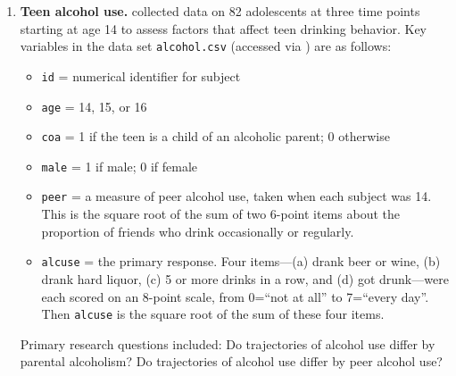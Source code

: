 \documentclass[
]{krantz}
\providecommand{\tightlist}{%
  \setlength{\itemsep}{0pt}\setlength{\parskip}{0pt}}
\begin{document}
\begin{enumerate}
\def\labelenumi{\arabic{enumi}.}
\item
  \textbf{Teen alcohol use.} \citet{Curran1997} collected data on 82 adolescents at three time points starting at age 14 to assess factors that affect teen drinking behavior. Key variables in the data set \texttt{alcohol.csv} (accessed via \citet{Singer2003}) are as follows:

  \begin{itemize}
  \tightlist
  \item
    \texttt{id} = numerical identifier for subject
  \item
    \texttt{age} = 14, 15, or 16
  \item
    \texttt{coa} = 1 if the teen is a child of an alcoholic parent; 0 otherwise
  \item
    \texttt{male} = 1 if male; 0 if female
  \item
    \texttt{peer} = a measure of peer alcohol use, taken when each subject was 14. This is the square root of the
    sum of two 6-point items about the proportion of friends who drink occasionally or regularly.
  \item
    \texttt{alcuse} = the primary response. Four items---(a) drank beer or wine, (b) drank hard liquor, (c) 5 or
    more drinks in a row, and (d) got drunk---were each scored on an 8-point scale, from 0=``not at all'' to
    7=``every day''. Then \texttt{alcuse} is the square root of the sum of these four items.
  \end{itemize}

  Primary research questions included: Do trajectories of alcohol use differ by parental alcoholism? Do trajectories of alcohol use differ by peer alcohol use?


\end{enumerate}
\end{document}
